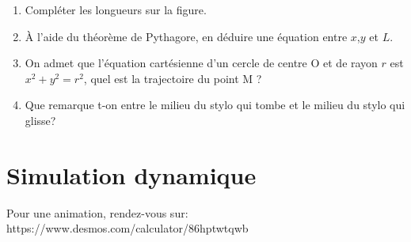 \documentclass[french]{article}
\begin{document}
\begin{enumerate}
\item Compléter les longueurs sur la figure.
\item À l'aide du théorème de Pythagore, en déduire une équation entre $x$,$y$ et $L$.
\item On admet que l'équation cartésienne d'un cercle de centre O et de rayon $r$ est $x^2+y^2=r^2$, quel est la trajectoire du point M ? 
\item Que remarque t-on entre le milieu du stylo qui tombe et le milieu du stylo qui glisse?
\end{enumerate}

\section{Simulation dynamique}
Pour une animation, rendez-vous sur:
https://www.desmos.com/calculator/86hptwtqwb
\end{document}
